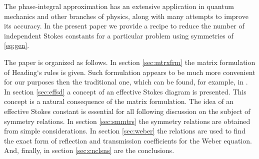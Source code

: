 \documentclass[atmp]{ipart_v1}
\newcommand\eref[1]{\eqref{#1}}
\newcommand\sref[1]{section \ref{#1}}
\begin{document}
The phase-integral approximation has an extensive application in quantum mechanics and other branches of
physics, along with many attempts to improve its accuracy\cite{dunham,dingle73,berry90,berry91,sergeenko96,delabaere97,sergeenko02,mirnov10,poor16,esposito09,aleixo00}. 
In the present paper we provide a recipe to reduce the number 
of independent Stokes constants for a particular problem using symmetries of \eref{eq:gen}. 

The paper is organized as follows. 
In \sref{sec:mtrxfrm} the matrix formulation of Heading`s rules is given. Such formulation appears
to be much more convenient for our purposes then the traditional one, which can be found, 
for example, in \cite{white}.
In \sref{sec:effsd} a concept of an effective Stokes diagram is presented. This concept is a natural
consequence of the matrix formulation. The idea of an effective Stokes constant is
essential for all following discussion on the subject of symmetry relations.
In \sref{sec:smmtrs} the symmetry relations are obtained from simple considerations. 
In \sref{sec:weber} the relations are used to find the exact form of reflection and 
transmission coefficients for the Weber equation. 
And, finally, in \sref{sec:cnclsns} are the conclusions. 
\end{document}
